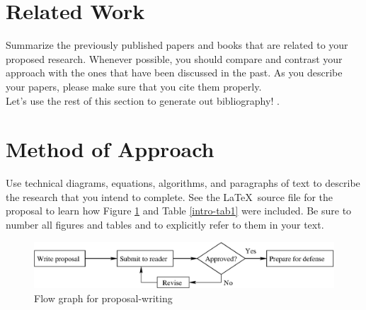 \documentclass[11pt]{article}
\begin{document}
\section{Related Work}
\label{sec:relatedwork}
\vspace*{-.1in}


Summarize the previously published papers and books that are related
to your proposed research.  Whenever possible, you should compare and
contrast your approach with the ones that have been discussed in the
past.  As you describe your papers, please make sure that you cite
them properly.
\\Let's use the rest of this section to generate out bibliography!
\cite{nettuts:pdosqli}
\cite{about:rename}
\cite{php:uploads}
\cite{catpa:gdcode}
\cite{ubuntu:lampsetup}
\cite{nix:gdsetup}
\cite{php:gdimg}
\cite{Foo:2007}
\cite{Srinivasan:2008}
\cite{Lee:2010}.

\vspace*{-.2in}
\section{Method of Approach}
\label{sec:method}
\vspace*{-.1in}


Use technical diagrams, equations, algorithms, and paragraphs of text
to describe the research that you intend to complete. See the \LaTeX\ source
file for the proposal to learn how Figure \ref{intro-fig1} and Table 
\ref{intro-tab1} were included. Be sure to number all figures and tables and to
explicitly refer to them in your text.

\begin{figure}[htbp]
\centering
\includegraphics[width=5in]{flow}
\caption{Flow graph for proposal-writing}
\label{intro-fig1}
\end{figure}
\end{document}
